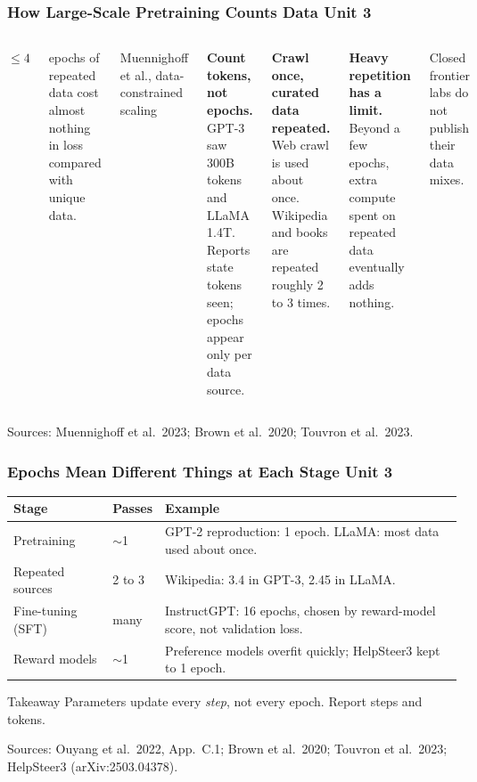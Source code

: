 \documentclass[12pt]{beamer}
\newcommand{\FrameTitle}[2]{\frametitle{#1 \hfill \small\textnormal{\textcolor{midgray}{#2}}}}
\begin{document}
\begin{frame}\FrameTitle{How Large-Scale Pretraining Counts Data}{Unit 3}
\begin{columns}[T]
  {\Huge\alert{$\le 4$}}\medskip

  epochs of repeated data cost almost nothing in loss compared with unique data.\medskip

  {\small Muennighoff et al., data-constrained scaling}

  \textbf{\alert{Count tokens, not epochs.}}
  GPT-3 saw 300B tokens and LLaMA 1.4T. Reports state tokens seen; epochs appear only per data source.\medskip

  \textbf{\alert{Crawl once, curated data repeated.}}
  Web crawl is used about once. Wikipedia and books are repeated roughly 2 to 3 times.\medskip

  \textbf{\alert{Heavy repetition has a limit.}}
  Beyond a few epochs, extra compute spent on repeated data eventually adds nothing.\medskip

  {\small Closed frontier labs do not publish their data mixes.}
\end{columns}

\vspace*{6pt}
{\footnotesize Sources: Muennighoff et al.\ 2023; Brown et al.\ 2020; Touvron et al.\ 2023.}
\end{frame}

\begin{frame}\FrameTitle{Epochs Mean Different Things at Each Stage}{Unit 3}
\renewcommand{\arraystretch}{1.4}
\begin{tabular}{@{}p{}p{}p{}@{}}
  \alert{\textbf{Stage}} & \alert{\textbf{Passes}} & \alert{\textbf{Example}}\\
  \hline
  Pretraining & $\sim$1 & GPT-2 reproduction: 1 epoch. LLaMA: most data used about once.\\
  Repeated sources & 2 to 3 & Wikipedia: 3.4 in GPT-3, 2.45 in LLaMA.\\
  Fine-tuning (SFT) & many & InstructGPT: 16 epochs, chosen by reward-model score, not validation loss.\\
  Reward models & $\sim$1 & Preference models overfit quickly; HelpSteer3 kept to 1 epoch.\\
\end{tabular}
\bigskip

\begin{block}{Takeaway}
Parameters update every \emph{step}, not every epoch. Report steps and tokens.
\end{block}
\vfill
{\footnotesize Sources: Ouyang et al.\ 2022, App.\ C.1; Brown et al.\ 2020; Touvron et al.\ 2023; HelpSteer3 (arXiv:2503.04378).}
\end{frame}
\end{document}
